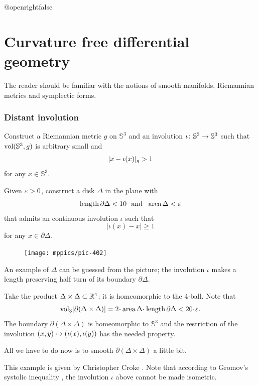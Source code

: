 \csname @openrightfalse\endcsname
\chapter{Curvature free differential geometry}

The reader should be familiar 
with the notions of smooth manifolds, 
Riemannian metrics and symplectic forms.

\subsection*{Distant involution}
\label{Distant involution}

\begin{pr}
Construct a Riemannian metric $g$ on $\mathbb{S}^3$ and an involution $\iota\:\mathbb{S}^3\z\to\mathbb{S}^3$ such that $\operatorname{\rm vol}\nolimits (\mathbb{S}^3,g)$ is arbitrary small and 
\[|x\z-\iota(x)|_g>1\]
 for any $x\in\mathbb{S}^3$.
\end{pr}


Given $\varepsilon>0$, construct a disk $\Delta$ in the plane with 
\[\operatorname{\rm length}\partial \Delta<10\ \ \text{and}\ \ \operatorname{\rm area}\nolimits \Delta<\varepsilon\]
that admits an continuous involution $\iota$ such that 
\[|\iota(x)-x|\ge 1\]
for any $x\in\partial \Delta$.

\begin{figure}
\vskip-0mm
\centering
\texttt{[image: mppics/pic-402]}
\end{figure}

An example of $\Delta$ can be guessed from the picture;
the involution $\iota$ makes a length preserving half turn of its boundary $\partial \Delta$.


Take the product $\Delta\times \Delta\subset \mathbb{R}^4$;
it is homeomorphic to the 4-ball.
Note that 
$$\vol_3[\partial(\Delta\times \Delta)]=2\cdot\area \Delta\cdot\length \partial \Delta<20\cdot\eps.$$
The boundary $\partial(\Delta\times \Delta)$ is homeomorphic to $\mathbb{S}^3$
and the restriction of the involution $(x,y)\z\mapsto (\iota(x),\iota(y))$ has the needed property.

All we have to do now is to smooth $\partial(\Delta\times \Delta)$ a little bit.
\qeds

This example is given by Christopher Croke \cite{croke}.
Note that according to Gromov's systolic inequality \cite{gromov-filling}, 
the involution $\iota$ above cannot be made isometric.

